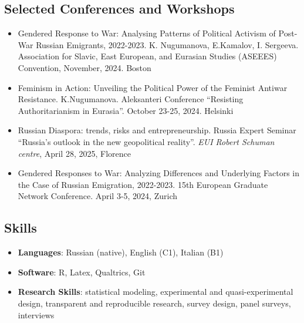 \documentclass[
]{article}
\providecommand{\tightlist}{%
  \setlength{\itemsep}{0pt}\setlength{\parskip}{0pt}}
\begin{document}
\hypertarget{selected-conferences-and-workshops}{%
\subsection{Selected Conferences and
Workshops}\label{selected-conferences-and-workshops}}

\begin{itemize}
\tightlist
\item
  Gendered Response to War: Analysing Patterns of Political Activism of
  Post-War Russian Emigrants, 2022-2023. K. Nugumanova, E.Kamalov, I.
  Sergeeva. Association for Slavic, East European, and Eurasian Studies
  (ASEEES) Convention, November, 2024. Boston
\item
  Feminism in Action: Unveiling the Political Power of the Feminist
  Antiwar Resistance. K.Nugumanova. Aleksanteri Conference ``Resisting
  Authoritarianism in Eurasia''. October 23-25, 2024. Helsinki
\item
  Russian Diaspora: trends, risks and entrepreneurship. Russia Expert
  Seminar ``Russia's outlook in the new geopolitical reality''.
  \emph{EUI Robert Schuman centre}, April 28, 2025, Florence
\item
  Gendered Responses to War: Analyzing Differences and Underlying
  Factors in the Case of Russian Emigration, 2022-2023. 15th European
  Graduate Network Conference. April 3-5, 2024, Zurich
\end{itemize}

\hypertarget{skills}{%
\subsection{Skills}\label{skills}}

\begin{itemize}
\item
  \textbf{Languages}: Russian (native), English (C1), Italian (B1)
\item
  \textbf{Software}: R, Latex, Qualtrics, Git
\item
  \textbf{Research Skills}: statistical modeling, experimental and
  quasi-experimental design, transparent and reproducible research,
  survey design, panel surveys, interviews
\end{itemize}
\end{document}
